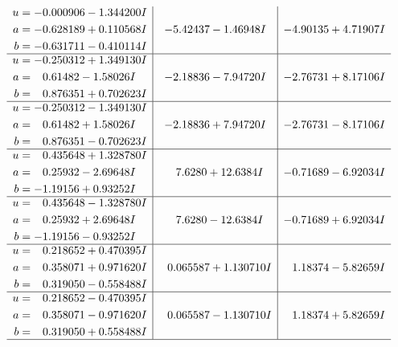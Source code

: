 \documentclass[1p]{elsarticle_modified}
\theoremstyle{definition}
\begin{document}
$$\begin{array}{c|c|c}
\begin{aligned}
u &= -0.000906 - 1.344200 I \\
a &= -0.628189 + 0.110568 I \\
b &= -0.631711 - 0.410114 I\end{aligned}
 & -5.42437 - 1.46948 I & -4.90135 + 4.71907 I \\ \hline\begin{aligned}
u &= -0.250312 + 1.349130 I \\
a &= \phantom{-}0.61482 - 1.58026 I \\
b &= \phantom{-}0.876351 + 0.702623 I\end{aligned}
 & -2.18836 - 7.94720 I & -2.76731 + 8.17106 I \\ \hline\begin{aligned}
u &= -0.250312 - 1.349130 I \\
a &= \phantom{-}0.61482 + 1.58026 I \\
b &= \phantom{-}0.876351 - 0.702623 I\end{aligned}
 & -2.18836 + 7.94720 I & -2.76731 - 8.17106 I \\ \hline\begin{aligned}
u &= \phantom{-}0.435648 + 1.328780 I \\
a &= \phantom{-}0.25932 - 2.69648 I \\
b &= -1.19156 + 0.93252 I\end{aligned}
 & \phantom{-}7.6280 + 12.6384 I & -0.71689 - 6.92034 I \\ \hline\begin{aligned}
u &= \phantom{-}0.435648 - 1.328780 I \\
a &= \phantom{-}0.25932 + 2.69648 I \\
b &= -1.19156 - 0.93252 I\end{aligned}
 & \phantom{-}7.6280 - 12.6384 I & -0.71689 + 6.92034 I \\ \hline\begin{aligned}
u &= \phantom{-}0.218652 + 0.470395 I \\
a &= \phantom{-}0.358071 + 0.971620 I \\
b &= \phantom{-}0.319050 - 0.558488 I\end{aligned}
 & \phantom{-}0.065587 + 1.130710 I & \phantom{-}1.18374 - 5.82659 I \\ \hline\begin{aligned}
u &= \phantom{-}0.218652 - 0.470395 I \\
a &= \phantom{-}0.358071 - 0.971620 I \\
b &= \phantom{-}0.319050 + 0.558488 I\end{aligned}
 & \phantom{-}0.065587 - 1.130710 I & \phantom{-}1.18374 + 5.82659 I\\
 \hline 
 \end{array}$$\newpage\newpage\renewcommand{\arraystretch}{1}
\end{document}
